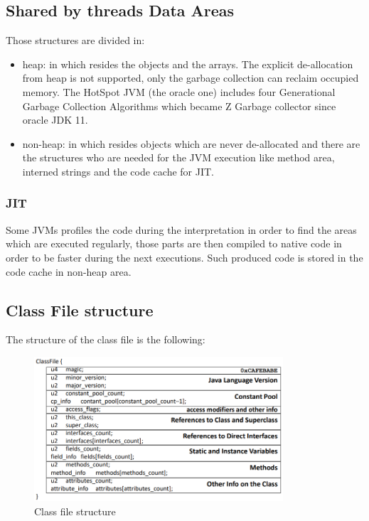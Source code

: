 \subsection{Shared by threads Data Areas}
Those structures are divided in:
\begin{itemize}
    \item heap: in which resides the objects and the arrays.
    The explicit de-allocation from heap is not supported, only the garbage collection can reclaim occupied memory.
    The HotSpot JVM (the oracle one) includes four Generational Garbage Collection Algorithms which became Z Garbage collector since oracle JDK 11.
    
    \item non-heap: in which resides objects which are never de-allocated and there are the structures who are needed for the JVM execution like method area, interned strings and the code cache for JIT.
\end{itemize}

\subsubsection{JIT}
Some JVMs profiles the code during the interpretation in order to find the areas which are executed regularly, those parts are then compiled to native code in order to be faster during the next executions.
Such produced code is stored in the code cache in non-heap area.

\subsection{Class File structure}
The structure of the class file is the following:
\begin{figure}[H]
    \centering
    \includegraphics[width=350px]{images/2_JVM/class_file_structure.png}
    \caption{Class file structure}
\end{figure}

